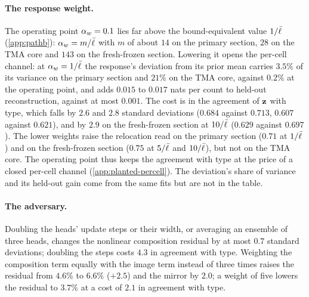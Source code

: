 \paragraph{The response weight.} The operating point $\alpha_w = 0.1$ lies far above the bound-equivalent value $1/\bar{\ell}$ (\cref{app:pathb}): $\alpha_w = m/\bar{\ell}$ with $m$ of about $14$ on the primary section, $28$ on the TMA core and $143$ on the fresh-frozen section. Lowering it opens the per-cell channel: at $\alpha_w = 1/\bar{\ell}$ the response's deviation from its prior mean carries $3.5\%$ of its variance on the primary section and $21\%$ on the TMA core, against $0.2\%$ at the operating point, and adds $0.015$ to $0.017$ nats per count to held-out reconstruction, against at most $0.001$. The cost is in the agreement of $\mathbf{z}$ with type, which falls by $2.6$ and $2.8$ standard deviations ($0.684$ against $0.713$, $0.607$ against $0.621$), and by $2.9$ on the fresh-frozen section at $10/\bar{\ell}$ ($0.629$ against $0.697$). The lower weights raise the relocation read on the primary section ($0.71$ at $1/\bar{\ell}$) and on the fresh-frozen section ($0.75$ at $5/\bar{\ell}$ and $10/\bar{\ell}$), but not on the TMA core. The operating point thus keeps the agreement with type at the price of a closed per-cell channel (\cref{app:planted-percell}). The deviation's share of variance and its held-out gain come from the same fits but are not in the table.

\paragraph{The adversary.} Doubling the heads' update steps or their width, or averaging an ensemble of three heads, changes the nonlinear composition residual by at most $0.7$ standard deviations; doubling the steps costs $4.3$ in agreement with type. Weighting the composition term equally with the image term instead of three times raises the residual from $4.6\%$ to $6.6\%$ ($+2.5$) and the mirror by $2.0$; a weight of five lowers the residual to $3.7\%$ at a cost of $2.1$ in agreement with type.

